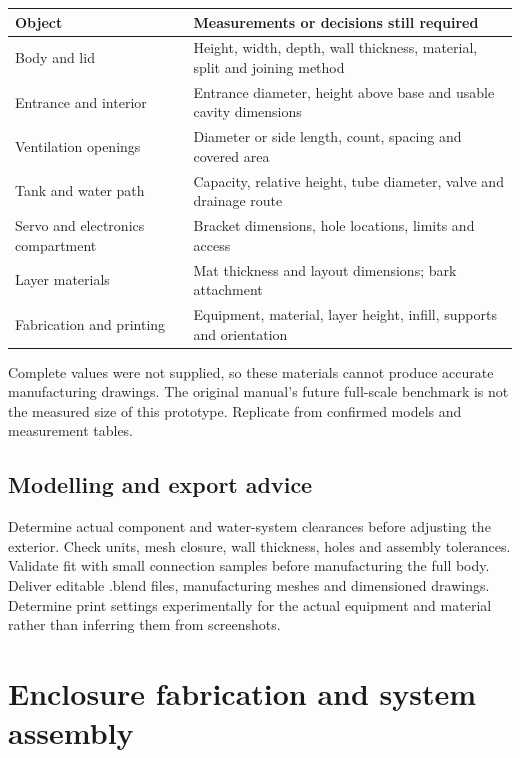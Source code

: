 \documentclass[10pt,a4paper]{article}
\begin{document}
\begin{longtable}{>{\raggedright\arraybackslash}p{54mm}>{\raggedright\arraybackslash}p{111mm}}
\toprule
\textbf{Object} & \textbf{Measurements or decisions still required}\\\midrule\endhead
Body and lid & Height, width, depth, wall thickness, material, split and joining method\\
Entrance and interior & Entrance diameter, height above base and usable cavity dimensions\\
Ventilation openings & Diameter or side length, count, spacing and covered area\\
Tank and water path & Capacity, relative height, tube diameter, valve and drainage route\\
Servo and electronics compartment & Bracket dimensions, hole locations, limits and access\\
Layer materials & Mat thickness and layout dimensions; bark attachment\\
Fabrication and printing & Equipment, material, layer height, infill, supports and orientation\\
\bottomrule\end{longtable}

Complete values were not supplied, so these materials cannot produce accurate manufacturing drawings. The original manual's future full-scale benchmark is not the measured size of this prototype. Replicate from confirmed models and measurement tables.


\subsection{Modelling and export advice}

Determine actual component and water-system clearances before adjusting the exterior. Check units, mesh closure, wall thickness, holes and assembly tolerances. Validate fit with small connection samples before manufacturing the full body. Deliver editable .blend files, manufacturing meshes and dimensioned drawings. Determine print settings experimentally for the actual equipment and material rather than inferring them from screenshots.



\clearpage\section{Enclosure fabrication and system assembly}
\end{document}
